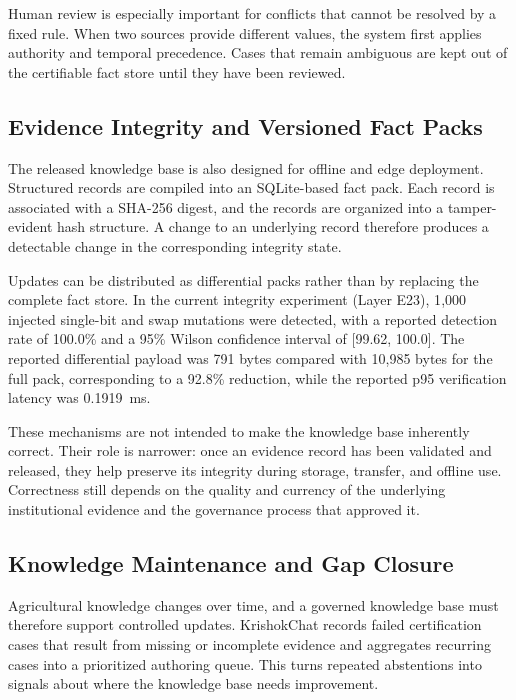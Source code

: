 \documentclass[a4paper,fleqn]{cas-dc}
\begin{document}
Human review is especially important for conflicts that cannot be resolved by a fixed rule. When two sources provide different values, the system first applies authority and temporal precedence. Cases that remain ambiguous are kept out of the certifiable fact store until they have been reviewed.

\subsection{Evidence Integrity and Versioned Fact Packs}

The released knowledge base is also designed for offline and edge deployment. Structured records are compiled into an SQLite-based fact pack. Each record is associated with a SHA-256 digest, and the records are organized into a tamper-evident hash structure. A change to an underlying record therefore produces a detectable change in the corresponding integrity state.

Updates can be distributed as differential packs rather than by replacing the complete fact store. In the current integrity experiment (Layer E23), 1{,}000 injected single-bit and swap mutations were detected, with a reported detection rate of 100.0\% and a 95\% Wilson confidence interval of [99.62, 100.0]. The reported differential payload was 791 bytes compared with 10{,}985 bytes for the full pack, corresponding to a 92.8\% reduction, while the reported p95 verification latency was 0.1919~ms.

These mechanisms are not intended to make the knowledge base inherently correct. Their role is narrower: once an evidence record has been validated and released, they help preserve its integrity during storage, transfer, and offline use. Correctness still depends on the quality and currency of the underlying institutional evidence and the governance process that approved it.

\subsection{Knowledge Maintenance and Gap Closure}

Agricultural knowledge changes over time, and a governed knowledge base must therefore support controlled updates. KrishokChat records failed certification cases that result from missing or incomplete evidence and aggregates recurring cases into a prioritized authoring queue. This turns repeated abstentions into signals about where the knowledge base needs improvement.
\end{document}
